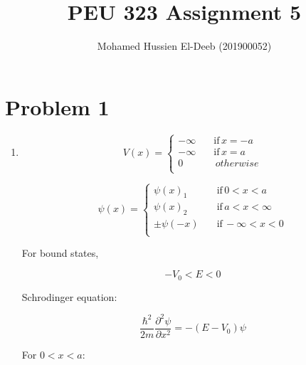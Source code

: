 \documentclass[12pt]{article}
\title{PEU 323 Assignment 5}
\author{Mohamed Hussien El-Deeb (201900052)}
\date{}
\begin{document}
\renewcommand{\labelenumi}{\textbf{(\alph{enumi})}}

\maketitle
\tableofcontents
\newpage
\section{Problem 1}

\begin{enumerate}
    \item
          \begin{equation*}
              V(x) =
              \begin{cases}
                  -\infty \quad & \text{if} \, x = -a \\
                  -\infty \quad & \text{if} \, x = a  \\
                  0 \quad       & \, otherwise        \\
              \end{cases}
          \end{equation*}

          \begin{equation*}
              \psi(x) =
              \begin{cases}
                  \psi(x)_1 \quad    & \text{if} \, 0 < x < a        \\
                  \psi(x)_2 \quad    & \text{if} \, a < x < \infty   \\
                  \pm \psi(-x) \quad & \text{if} \, - \infty < x < 0 \\
              \end{cases}
          \end{equation*}



          For bound states,

          \[
              -V_0 < E < 0
          \]

          Schrodinger equation:

          \[
              \frac{\hbar^2}{2m}\frac{\partial^2 \psi}{\partial x^2} = -(E - V_0) \psi
          \]

          For \(0 < x < a \):


\end{enumerate}
\end{document}
